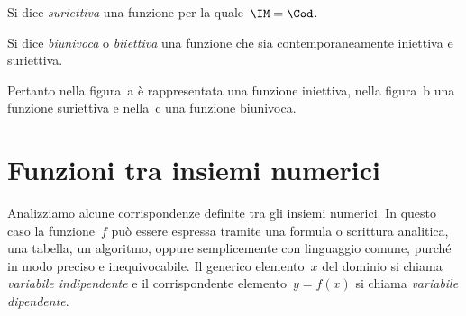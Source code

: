 \begin{definizione}
Si dice \emph{suriettiva} una funzione per la quale~$\IM = \Cod$.
\end{definizione}

\begin{definizione}
Si dice \emph{biunivoca} o \emph{biiettiva} una funzione che sia
contemporaneamente iniettiva e suriettiva.
\end{definizione}

Pertanto nella figura~a è rappresentata una funzione iniettiva, nella figura~b una
funzione suriettiva e nella~c una funzione biunivoca.

 \vspazio\ovalbox{\risolvii \ref{ese:8.4}, \ref{ese:8.5}}
% 

\section{Funzioni tra insiemi numerici}

Analizziamo alcune corrispondenze definite tra gli insiemi numerici. In
questo caso la funzione~$f$ può essere espressa
tramite una formula o scrittura analitica, una tabella, un algoritmo,
oppure semplicemente con linguaggio comune, purché in modo preciso e
inequivocabile. Il generico elemento~$x$ del dominio si chiama
\emph{variabile indipendente} e il corrispondente elemento~$y =f(x)$ si chiama \emph{variabile dipendente}.

